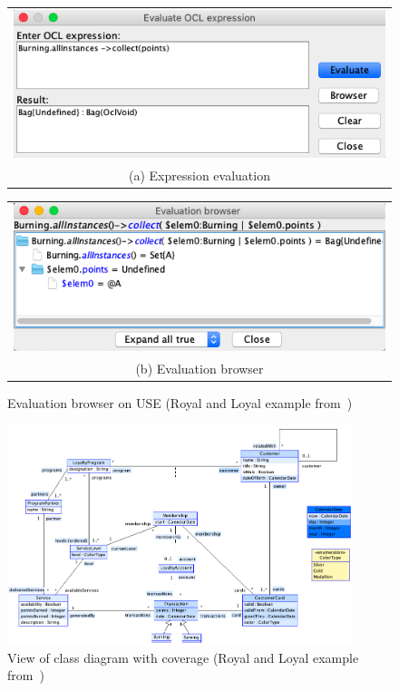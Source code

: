 \begin{figure}[ht]
  \centering
  \begin{tabular}{@{}c@{}}
    \includegraphics[width=.6\linewidth]{Chapters/figures/4_RelatedWork/05_USETool_1.png} \\[\abovecaptionskip]
    \small (a) Expression evaluation
  \end{tabular}

  \vspace{\floatsep}

  \begin{tabular}{@{}c@{}}
    \includegraphics[width=.6\linewidth]{Chapters/figures/4_RelatedWork/05_USETool_2.png} \\[\abovecaptionskip]
    \small (b) Evaluation browser
  \end{tabular}

  \caption{Evaluation browser on USE (Royal and Loyal example from~\cite{Warmer2003})}\label{fig:05_usetool2}
\end{figure}

\begin{figure}[ht]
\centering
\includegraphics[width=0.9\textwidth]{Chapters/figures/4_RelatedWork/05_USETool_3.png}
\caption{View of class diagram with coverage (Royal and Loyal example from~\cite{Warmer2003})}
\label{fig:05_usetool3}
\end{figure}

